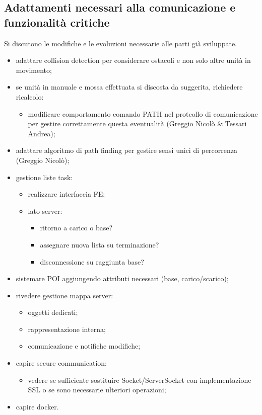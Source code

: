 \subsection{Adattamenti necessari alla comunicazione e funzionalità critiche}
    Si discutono le modifiche e le evoluzioni necessarie alle parti già sviluppate.
    \begin{itemize}
        \item adattare collision detection per considerare ostacoli e non solo altre unità in movimento;
        \item se unità in manuale e mossa effettuata si discosta da suggerita, richiedere ricalcolo:
        \begin{itemize}
            \item modificare comportamento comando PATH nel protcollo di comunicazione per gestire correttamente questa eventualità (Greggio Nicolò \& Tessari Andrea);
        \end{itemize}
        \item adattare algoritmo di path finding per gestire sensi unici di percorrenza (Greggio Nicolò);
        \item gestione liste task:
        \begin{itemize}
            \item realizzare interfaccia FE;
            \item lato server:
            \begin{itemize}
                \item ritorno a carico o base?
                \item assegnare nuova lista su terminazione?
                \item disconnessione su raggiunta base?
            \end{itemize}
        \end{itemize}
        \item sistemare POI aggiungendo attributi necessari (base, carico/scarico);
        \item rivedere gestione mappa server:
        \begin{itemize}
            \item oggetti dedicati;
            \item rappresentazione interna;
            \item comunicazione e notifiche modifiche;
        \end{itemize}
        \item capire secure communication:
        \begin{itemize}
            \item vedere se sufficiente sostituire Socket/ServerSocket con implementazione SSL o se sono necessarie ulteriori operazioni;
        \end{itemize}
        \item capire docker.
    \end{itemize}













